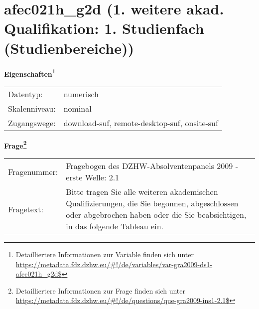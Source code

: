 
    \setcounter{footnote}{0}

    \vspace*{-1.8cm}
	\section{afec021h\_g2d (1. weitere akad. Qualifikation: 1. Studienfach (Studienbereiche))}
	\label{section:afec021h_g2d}



    \vspace*{0.5cm}
    \noindent\textbf{Eigenschaften\footnote{Detailliertere Informationen zur Variable finden sich unter
		\url{https://metadata.fdz.dzhw.eu/\#!/de/variables/var-gra2009-ds1-afec021h_g2d$}}}\\
	\begin{tabularx}{\hsize}{@{}lX}
	Datentyp: & numerisch \\
	Skalenniveau: & nominal \\
	Zugangswege: &
	  download-suf, 
	  remote-desktop-suf, 
	  onsite-suf
 \\
    \end{tabularx}



				\vspace*{0.5cm}
                \noindent\textbf{Frage\footnote{Detailliertere Informationen zur Frage finden sich unter
		              \url{https://metadata.fdz.dzhw.eu/\#!/de/questions/que-gra2009-ins1-2.1$}}}\\
				\begin{tabularx}{\hsize}{@{}lX}
					Fragenummer: &
					  Fragebogen des DZHW-Absolventenpanels 2009 - erste Welle:
					  2.1
 \\
					Fragetext: & Bitte tragen Sie alle weiteren akademischen Qualifizierungen, die Sie begonnen, abgeschlossen oder abgebrochen haben oder die Sie beabsichtigen, in das folgende Tableau ein. \\
				\end{tabularx}





